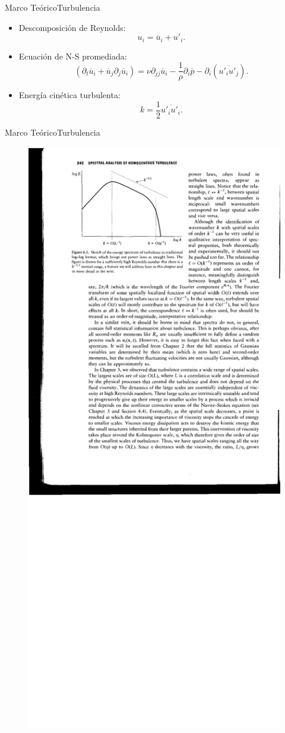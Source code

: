 \documentclass[mathserif,10pt]{beamer}
\newcommand{\be}{\begin{equation}}
\newcommand{\ee}{\end{equation}}
\begin{document}
\begin{frame}{Marco Teórico}{Turbulencia}
	\begin{itemize}
		\item Descomposición de Reynolds:
		\be u_i = \overline{u}_i + u'_i. \ee
		\item Ecuación de N-S promediada:
		\be
		(\partial_t \overline{u}_i + \overline{u}_j\partial_j \overline{u}_i)= \nu\partial_{jj}\overline{u}_i -\frac{1}{\rho}\partial_i \overline{p} - \partial_i(\overline{u'_iu'_j}).
		\ee
		\item Energía cinética turbulenta:
		\be k=\frac{1}{2}\overline{u'_i u'_i}. \ee
	\end{itemize}
\end{frame}

\begin{frame}{Marco Teórico}{Turbulencia}
	\begin{figure}[h!]
		\centering
		\includegraphics[width=0.75\linewidth,trim={3.2cm 18.3cm 7.0cm 1.5cm},clip]{fig/03/spectra}

\end{figure}
\end{frame}
\end{document}
